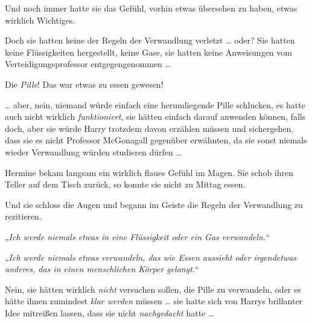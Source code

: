 Und noch immer hatte sie das Gefühl, vorhin etwas übersehen zu haben, etwas wirklich Wichtiges.

Doch sie hatten keine der Regeln der Verwandlung verletzt … oder? Sie hatten keine Flüssigkeiten hergestellt, keine Gase, sie hatten keine Anweisungen vom Verteidigungsprofessor entgegengenommen …

Die \emph{Pille}! Das war etwas zu essen gewesen!

… aber, nein, niemand würde einfach eine herumliegende Pille schlucken, es hatte auch nicht wirklich \emph{funktioniert}, sie hätten einfach  darauf anwenden können, falls doch, aber sie würde Harry trotzdem davon erzählen müssen und sichergehen, dass sie es nicht Professor McGonagall gegenüber erwähnten, da sie sonst niemals wieder Verwandlung würden studieren dürfen …

Hermine bekam langsam ein wirklich flaues Gefühl im Magen. Sie schob ihren Teller auf dem Tisch zurück, so konnte sie nicht zu Mittag essen.

Und sie schloss die Augen und begann im Geiste die Regeln der Verwandlung zu rezitieren.

„\emph{Ich werde niemals etwas in eine Flüssigkeit oder ein Gas verwandeln.}“

„\emph{Ich werde niemals etwas verwandeln, das wie Essen aussieht oder irgendetwas anderes, das in einen menschlichen Körper gelangt.}“

Nein, sie hätten wirklich \emph{nicht} versuchen sollen, die Pille zu verwandeln, oder es hätte ihnen zumindest \emph{klar werden} müssen … sie hatte sich von Harrys brillanter Idee mitreißen lassen, dass sie nicht \emph{nachgedacht} hatte …

